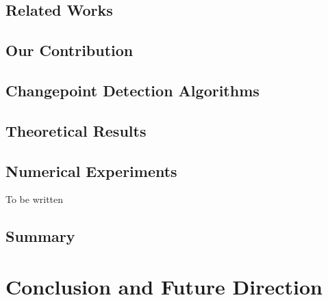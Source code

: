 \documentclass[MS]{iitmdiss}
\begin{document}
\section{Related Works}
\label{psbandit:related}


\section{Our Contribution}
\label{psbandit:contribution}


\section{Changepoint Detection Algorithms}
\label{psbandit:algorithm}



\section{Theoretical Results}
\label{psbandit:results}



\section{Numerical Experiments}
\label{psbandit:expt}
To be written
%


\section{Summary}
\label{psbandit:conclusion}




\chapter{Conclusion and Future Direction}
\label{ThesisConc}



\appendix

\end{document}
